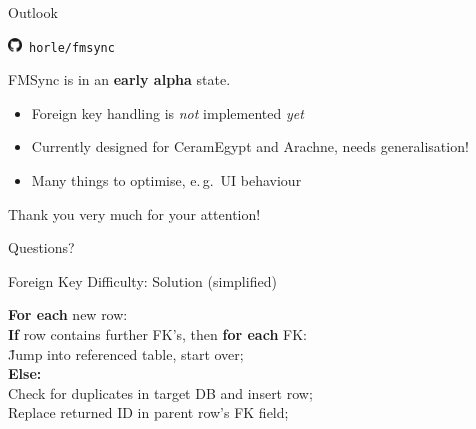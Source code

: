 \documentclass[xcolor=x11names, aspectratio=169,usenames,dvipsnames]{beamer}
\begin{document}
\begin{frame}{Outlook}\large
\begin{center}\LARGE
\includegraphics[width=1em]{img/github}\  \texttt{horle/fmsync}
\end{center}

FMSync is in an \textbf{early alpha} state.\pause

\begin{itemize}[<+->]
\item Foreign key handling is \emph{not} implemented \emph{yet}
\item Currently designed for CeramEgypt and Arachne, needs generalisation!
\item Many things to optimise, e.\,g.\ UI behaviour
\end{itemize}
\end{frame}

\begin{frame}
\vfill
\begin{center}\Large
Thank you very much for your attention!\\\bigskip

Questions?
\end{center}\vfill
\end{frame}

\maketitle

\appendix

\begin{frame}{Foreign Key Difficulty: Solution (simplified)}\large\ttfamily
\begin{spacing}{1.5}
\begin{tabbing}
\textbf{For each} new row:\\
\qquad\= \textbf{If} row contains \alert{further FK's}, then \textbf{for each} FK:\\
\>\qquad\= Jump into referenced table, start over;\\
\> \textbf{Else:}\\
\>\> Check for duplicates in target DB and \alert{insert row};\\
\>\> \alert{Replace returned ID in parent row's FK field};
\end{tabbing}
\end{spacing}
\end{frame}
\end{document}
